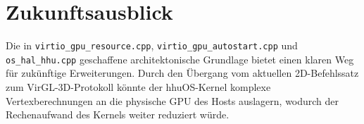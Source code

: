 \section{Zukunftsausblick}

Die in \texttt{virtio\_gpu\_resource.cpp},
\texttt{virtio\_gpu\_autostart.cpp} und \texttt{os\_hal\_hhu.cpp} geschaffene
architektonische Grundlage bietet einen klaren Weg für zukünftige
Erweiterungen. Durch den Übergang vom aktuellen 2D-Befehlssatz zum
VirGL-3D-Protokoll könnte der hhuOS-Kernel komplexe Vertexberechnungen an die
physische GPU des Hosts auslagern, wodurch der Rechenaufwand des Kernels weiter
reduziert würde.